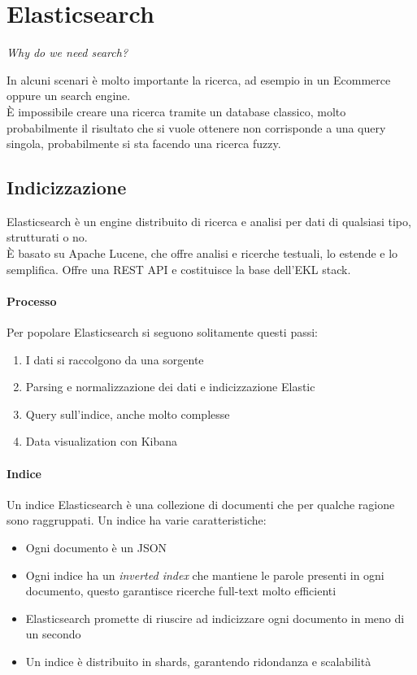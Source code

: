 \section{Elasticsearch}
\begin{center}
    \emph{Why do we need search?}
\end{center}
In alcuni scenari è molto importante la ricerca, ad esempio in un Ecommerce oppure
un search engine.\\
È impossibile creare una ricerca tramite un database classico, molto probabilmente
il risultato che si vuole ottenere non corrisponde a una query singola, probabilmente
si sta facendo una ricerca fuzzy.

\subsection{Indicizzazione}
Elasticsearch è un engine distribuito di ricerca e analisi per dati di qualsiasi tipo, 
strutturati o no.\\
È basato su Apache Lucene, che offre analisi e ricerche testuali, lo estende e lo semplifica.
Offre una REST API e costituisce la base dell'EKL stack.

\paragraph{Processo}
Per popolare Elasticsearch si seguono solitamente questi passi:
\begin{enumerate}
    \item I dati si raccolgono da una sorgente
    \item Parsing e normalizzazione dei dati e indicizzazione Elastic
    \item Query sull'indice, anche molto complesse
    \item Data visualization con Kibana
\end{enumerate}

\paragraph{Indice}
Un indice Elasticsearch è una collezione di documenti che per qualche ragione sono raggruppati.
Un indice ha varie caratteristiche:
\begin{itemize}
    \item Ogni documento è un JSON
    \item Ogni indice ha un \emph{inverted index} che mantiene le parole presenti in ogni documento, 
    questo garantisce ricerche full-text molto efficienti
    \item Elasticsearch promette di riuscire ad indicizzare ogni documento in meno di un secondo
    \item Un indice è distribuito in shards, garantendo ridondanza e scalabilità
\end{itemize}

